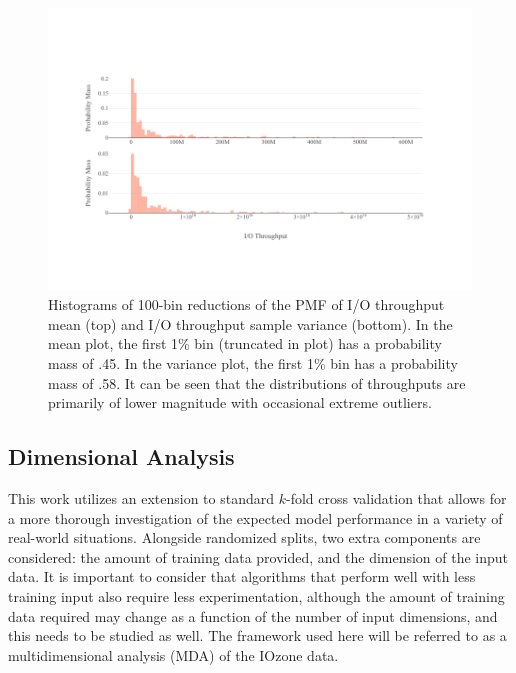\documentclass{scspaperproc}
\theoremstyle{scsthe}
\begin{document}
\begin{figure}
  \centering
  \includegraphics[width=\textwidth,trim={0 .5in 0 1in}]{Raw_Throughput.pdf}
  \caption{Histograms of 100-bin reductions of the PMF of I/O
    throughput mean (top) and I/O throughput sample variance
    (bottom). In the mean plot, the first 1\% bin (truncated in plot)
    has a probability mass of .45. In the variance plot, the first 1\%
    bin has a probability mass of .58. It can be seen that the
    distributions of throughputs are primarily of lower magnitude with
    occasional extreme outliers.}
  \label{fig:raw_throughput}
\end{figure}

\subsection{Dimensional Analysis}
This work utilizes an extension to standard $k$-fold cross validation
that allows for a more thorough investigation of the expected model
performance in a variety of real-world situations. Alongside
randomized splits, two extra components are considered: the amount of
training data provided, and the dimension of the input data. It is
important to consider that algorithms that perform well with less
training input also require less experimentation, although the amount
of training data required may change as a function of the number of
input dimensions, and this needs to be studied as well. The framework
used here will be referred to as a multidimensional analysis (MDA) of
the IOzone data.
\end{document}
